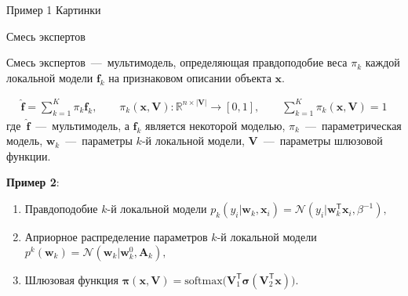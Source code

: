 \documentclass[9pt,pdf,hyperref={unicode}]{beamer}
\begin{document}
\begin{frame}{Пример 1}
\justifying
Картинки
\end{frame}
\begin{frame}{Смесь экспертов}
\justifying
\begin{definition}
\label{sl:5:eq:1}
Смесь экспертов~---~мультимодель, определяющая правдоподобие веса $\pi_k$ каждой локальной модели $\textbf{f}_k$ на признаковом описании объекта $\textbf{x}$.

\begin{equation}
\label{sl:5:eq:2}
\begin{aligned}
\hat{\mathbf{f}} = \sum_{k=1}^{K}\pi_{k}\mathbf{f}_k, \qquad \pi_{k}\left(\mathbf{x}, \mathbf{V}\right):\mathbb{R}^{n\times \left|\mathbf{V}\right|} \to [0, 1], \qquad \sum_{k=1}^{K}\pi_{k}\left(\mathbf{x}, \mathbf{V}\right) = 1
\end{aligned}
\end{equation}
где~$\hat{\mathbf{f}}$~---~мультимодель, а $\mathbf{f}_k$ является некоторой моделью, $\pi_k$~---~параметрическая модель, $\mathbf{w}_k$~---~параметры $k$-й локальной модели, $\mathbf{V}$~---~параметры шлюзовой функции.
\end{definition}
{\bf Пример 2}:
	\begin{enumerate}
		\item Правдоподобие $k$-й локальной модели $p_{k}\left(y_{i}|\mathbf{w}_{k}, \mathbf{x}_{i}\right) = \mathcal{N}\left(y_{i}|\mathbf{w}_{k}^{\mathsf{T}}\mathbf{x}_{i}, \beta^{-1}\right),$
		\item Априорное распределение параметров $k$-й локальной модели $p^{k}\left(\mathbf{w}_{k}\right) = \mathcal{N}\left(\mathbf{w}_{k}|\mathbf{w}^{0}_{k}, \mathbf{A}_{k}\right),$
		\item Шлюзовая функция $\bm{\pi}\left(\mathbf{x}, \mathbf{V}\right) = \text{softmax}\bigr(\mathbf{V}_{1}^{\mathsf{T}}\bm{\sigma}\left(\mathbf{V}_2^{\mathsf{T}}\mathbf{x}\right)\bigr).$
	\end{enumerate}
\end{frame}
\end{document}
